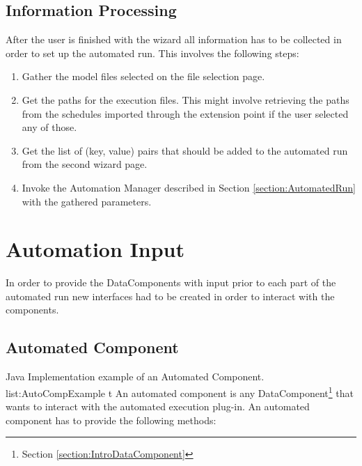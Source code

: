 \subsection{Information Processing}
\label{section:InformationProcessing}
After the user is finished with the wizard all information has to be collected in order to set up the automated run.
This involves the following steps:
\begin{enumerate}
 \item Gather the model files selected on the file selection page.
 \item Get the paths for the execution files. This might involve retrieving the paths from the schedules imported through
the extension point if the user selected any of those.
 \item Get the list of (key, value) pairs that should be added to the automated run from the second wizard page.
 \item Invoke the Automation Manager described in Section \ref{section:AutomatedRun} with the gathered parameters.
\end{enumerate}


\section{Automation Input}
\label{section:AutoInput}
In order to provide the DataComponents with input prior to each part of the automated run new interfaces
had to be created in order to interact with the components. 

\subsection{Automated Component}
\label{section:AutomatedComponent}
\listingjava
{}
{Java}
{Implementation example of an Automated Component.}
{list:AutoCompExample}
{t}
An automated component is any DataComponent\footnote{Section \ref{section:IntroDataComponent}} that wants to interact with
the automated execution plug-in. An automated component has to provide the following methods:

